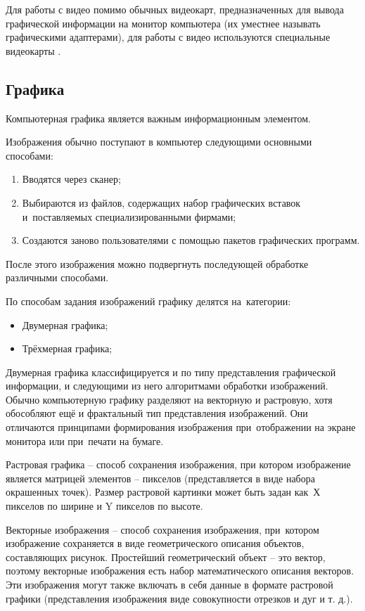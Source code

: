 \documentclass{ou}
\begin{document}
Для работы с видео помимо обычных видеокарт, предназначенных для вывода графической информации на монитор компьютера (их уместнее называть графическими адаптерами), для работы с видео используются специальные видеокарты \cite{Katsko_2015}.
\subsection{Графика}
Компьютерная графика является важным информационным элементом.

Изображения обычно поступают в компьютер следующими основными способами:
\begin{enumerate}[leftmargin=0em, itemindent=3.75em, nosep, label=\arabic*)]
\item Вводятся через сканер;
\item Выбираются из файлов, содержащих набор графических вставок и~поставляемых специализированными фирмами;
\item Создаются заново пользователями с помощью пакетов графических программ.
\end{enumerate}

После этого изображения можно подвергнуть последующей обработке различными способами.

По способам задания изображений графику делятся на~категории:
\begin{itemize}[label=-, leftmargin=0em, itemindent=3.35em, nosep]
\item Двумерная графика;
\item Трёхмерная графика;
\end{itemize}

Двумерная графика классифицируется и по типу представления графической информации, и следующими из него алгоритмами обработки изображений. Обычно компьютерную графику разделяют на векторную и растровую, хотя обособляют ещё и фрактальный тип представления изображений. Они отличаются принципами формирования изображения при~отображении на экране монитора или при~печати на бумаге.

Растровая графика -- способ сохранения изображения, при котором изображение является матрицей элементов -- пикселов (представляется в виде набора окрашенных точек). Размер растровой картинки может быть задан как~Х пикселов по ширине и Y пикселов по высоте. 

Векторные изображения -- способ сохранения изображения, при~котором изображение сохраняется в виде геометрического описания объектов, составляющих рисунок. Простейший геометрический объект -- это вектор, поэтому векторные изображения есть набор математического описания векторов. Эти изображения могут также включать в себя данные в формате растровой графики (представления изображения виде совокупности отрезков и дуг и т. д.). 
\end{document}
